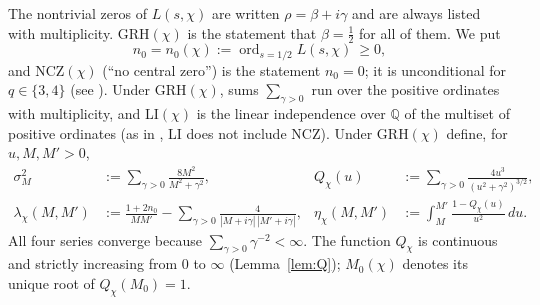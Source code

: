 \documentclass[11pt]{amsart}
\theoremstyle{definition}
\numberwithin{equation}{section}
\begin{document}
The nontrivial zeros of $L(s,\chi)$ are written $\rho=\beta+i\gamma$
and are always listed with multiplicity. GRH$(\chi)$ is the statement
that $\beta=\tfrac12$ for all of them. We put
\[
n_0=n_0(\chi):=\operatorname{ord}_{s=1/2}L(s,\chi)\ \ge0 ,
\]
and NCZ$(\chi)$ (``no central zero'') is the statement $n_0=0$; it is
unconditional for $q\in\{3,4\}$ (see \cite[\S2]{WR}). Under
GRH$(\chi)$, sums $\sum_{\gamma>0}$ run over the positive ordinates
with multiplicity, and LI$(\chi)$ is the linear independence over
$\mathbb Q$ of the multiset of positive ordinates (as in \cite{WR}, LI
does not include NCZ). Under GRH$(\chi)$ define, for $u,M,M'>0$,
\begin{align}
\sigma_M^2&:=\sum_{\gamma>0}\frac{8M^2}{M^2+\gamma^2},
&Q_\chi(u)&:=\sum_{\gamma>0}\frac{4u^3}{(u^2+\gamma^2)^{3/2}},
\label{eq:defQ}\\
\lambda_\chi(M,M')&:=\frac{1+2n_0}{MM'}
-\sum_{\gamma>0}\frac{4}{|M+i\gamma|\,|M'+i\gamma|},
&\eta_\chi(M,M')&:=\int_M^{M'}\frac{1-Q_\chi(u)}{u^2}\,du .
\label{eq:deflambda}
\end{align}
All four series converge because $\sum_{\gamma>0}\gamma^{-2}<\infty$.
The function $Q_\chi$ is continuous and strictly increasing from $0$
to $\infty$ (Lemma~\ref{lem:Q}); $M_0(\chi)$ denotes its unique root
of $Q_\chi(M_0)=1$.
\end{document}

